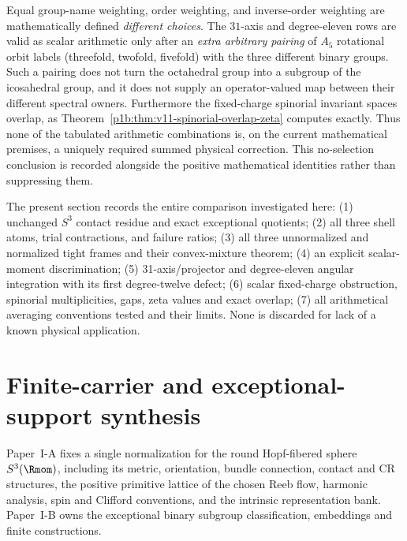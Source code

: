 \documentclass[11pt]{article}
\begin{document}
\begin{remark}
\label{p1b:rem:v11-no-canonical-three-determinant-weight}
Equal group-name weighting, order weighting, and inverse-order
weighting are mathematically defined \emph{different choices}.
The $31$-axis and degree-eleven rows are valid as scalar arithmetic
only after an \emph{extra arbitrary pairing} of $A_5$ rotational
orbit labels (threefold, twofold, fivefold) with the three different
binary groups.  Such a pairing does not turn the octahedral group
into a subgroup of the icosahedral group, and it does not supply an
operator-valued map between their different spectral owners.
Furthermore the fixed-charge spinorial invariant spaces overlap, as
Theorem~\ref{p1b:thm:v11-spinorial-overlap-zeta} computes exactly.
Thus none of the tabulated arithmetic combinations is, on the current
mathematical premises, a uniquely required summed physical correction.
This no-selection conclusion is recorded alongside the positive
mathematical identities rather than suppressing them.
\end{remark}

\begin{remark}
The present section records the entire comparison investigated here:
(1) unchanged $S^3$ contact residue and exact exceptional quotients;
(2) all three shell atoms, trial contractions, and failure ratios;
(3) all three unnormalized and normalized tight frames and their
convex-mixture theorem; (4) an explicit scalar-moment discrimination;
(5) 31-axis/projector and degree-eleven angular integration with its
first degree-twelve defect; (6) scalar fixed-charge obstruction,
spinorial multiplicities, gaps, zeta values and exact overlap;
(7) all arithmetical averaging conventions tested and their limits.
None is discarded for lack of a known physical application.
\end{remark}


\section{Finite-carrier and exceptional-support synthesis}
\label{p1:sec:conclusion}

Paper~I-A fixes a single normalization for the round Hopf-fibered sphere
\(S^3(\Rmom)\), including its metric, orientation, bundle connection, contact
and CR structures, the positive primitive lattice of the chosen Reeb flow,
harmonic analysis, spin and Clifford conventions, and the intrinsic representation bank.  Paper~I-B owns the
exceptional binary subgroup classification, embeddings and finite constructions.
\end{document}
